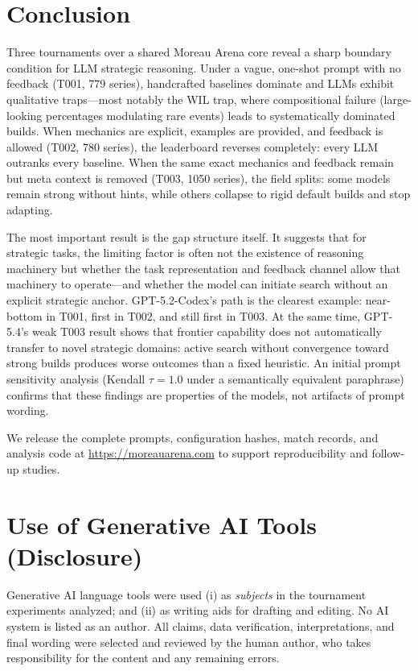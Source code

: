 \documentclass[11pt]{article}
\newcommand{\tOne}{T001}
\newcommand{\tTwo}{T002}
\newcommand{\tThree}{T003}
\begin{document}
\section{Conclusion}

Three tournaments over a shared Moreau Arena core reveal a sharp boundary condition for LLM strategic reasoning.
Under a vague, one-shot prompt with no feedback (\tOne, 779 series), handcrafted baselines dominate and LLMs exhibit qualitative traps---most notably the WIL trap, where compositional failure (large-looking percentages modulating rare events) leads to systematically dominated builds.
When mechanics are explicit, examples are provided, and feedback is allowed (\tTwo, 780 series), the leaderboard reverses completely: every LLM outranks every baseline.
When the same exact mechanics and feedback remain but meta context is removed (\tThree, 1050 series), the field splits: some models remain strong without hints, while others collapse to rigid default builds and stop adapting.

The most important result is the gap structure itself.
It suggests that for strategic tasks, the limiting factor is often not the existence of reasoning machinery but whether the task representation and feedback channel allow that machinery to operate---and whether the model can initiate search without an explicit strategic anchor.
GPT-5.2-Codex's path is the clearest example: near-bottom in \tOne, first in \tTwo, and still first in \tThree.
At the same time, GPT-5.4's weak \tThree{} result shows that frontier capability does not automatically transfer to novel strategic domains: active search without convergence toward strong builds produces worse outcomes than a fixed heuristic.
An initial prompt sensitivity analysis (Kendall $\tau=1.0$ under a semantically equivalent paraphrase) confirms that these findings are properties of the models, not artifacts of prompt wording.

We release the complete prompts, configuration hashes, match records, and analysis code at \url{https://moreauarena.com} to support reproducibility and follow-up studies.

\section*{Use of Generative AI Tools (Disclosure)}
Generative AI language tools were used (i) as \emph{subjects} in the tournament experiments analyzed; and (ii) as writing aids for drafting and editing.
No AI system is listed as an author.
All claims, data verification, interpretations, and final wording were selected and reviewed by the human author, who takes responsibility for the content and any remaining errors.
\end{document}
